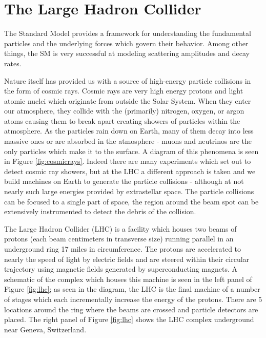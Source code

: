 \chapter{The Large Hadron Collider}
\label{chap:lhc}

The Standard Model provides a framework for understanding the fundamental particles and the underlying forces which govern their behavior. Among other things, the SM is very successful at modeling scattering amplitudes and decay rates. 

Nature itself has provided us with a source of high-energy particle collisions in the form of cosmic rays. Cosmic rays are very high energy protons and light atomic nuclei which originate from outside the Solar System. When they enter our atmosphere, they collide with the (primarily) nitrogen, oxygen, or argon atoms causing them to break apart creating showers of particles within the atmosphere. As the particles rain down on Earth, many of them decay into less massive ones or are absorbed in the atmosphere - muons and neutrinos are the only particles which make it to the surface. A diagram of this phenomena is seen in Figure \ref{fig:cosmicrays}. Indeed there are many experiments which set out to detect cosmic ray showers, but at the LHC a different approach is taken and we build machines on Earth to generate the particle collisions - although at not nearly such large energies provided by extrastellar space. The particle collisions can be focused to a single part of space, the region around the beam spot can be extensively instrumented to detect the debris of the collision. 

The Large Hadron Collider (LHC) is a facility which houses two beams of protons (each beam centimeters in transverse size) running parallel in an underground ring 17 miles in circumference. The protons are accelerated to nearly the speed of light by electric fields and are steered within their circular trajectory using magnetic fields generated by superconducting magnets. A schematic of the complex which houses this machine is seen in the left panel of Figure \ref{fig:lhc}; as seen in the diagram, the LHC is the final machine of a number of stages which each incrementally increase the energy of the protons. There are 5 locations around the ring where the beams are crossed and particle detectors are placed. The right panel of Figure \ref{fig:lhc} shows the LHC complex underground near Geneva, Switzerland.

